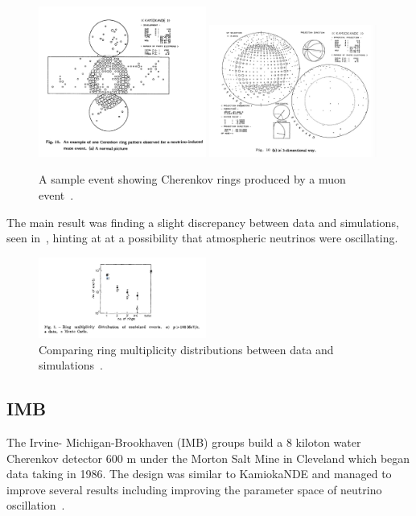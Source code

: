 \begin{figure}[h!]
\centering
  \centering
\includegraphics[width=0.49\textwidth]{figures/Kamioka2.jpeg}
\includegraphics[width=0.49\textwidth]{figures/Kamioka3.jpeg}
\vspace{2mm}
\caption{A sample event showing Cherenkov rings produced by a muon event~\cite{58KAMIOKA}.}
\label{fig:Kam2}
\end{figure}
The main result was finding a slight discrepancy between data and simulations, seen in~, hinting at at a possibility that atmospheric neutrinos were oscillating.
\begin{figure}[h!]
\centering
  \centering
\includegraphics[width=0.49\textwidth]{figures/Kamioka4.jpeg}
\vspace{2mm}
\caption{Comparing ring multiplicity distributions between data and simulations~\cite{59KAMIOKA}.}
\label{fig:Kam3}
\end{figure}

\subsection{IMB}
The Irvine- Michigan-Brookhaven (IMB) groups build a 8 kiloton water Cherenkov detector 600 m under the Morton Salt Mine in Cleveland which began data taking in 1986. The design was similar to KamiokaNDE and managed to improve several results including improving the parameter space of neutrino oscillation~\cite{60IMB}.


